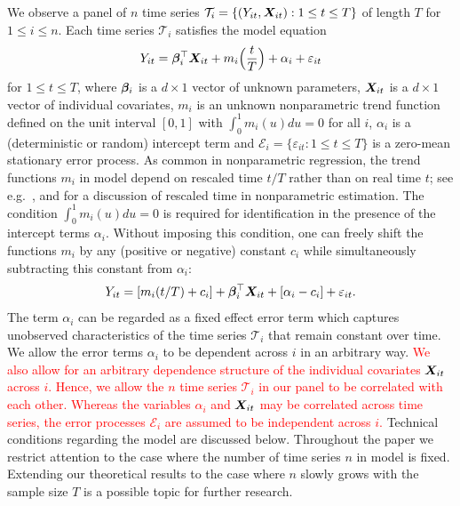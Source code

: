 \documentclass[a4paper,12pt]{article}
\makeatletter
\renewcommand{\eqref}[1]{\tagform@{\ref{#1}}}
\makeatother
\begin{document}
We observe a panel of $n$ time series $\mathcal{T}_i = \{(Y_{it}, \boldsymbol{X}_{it}): 1 \le t \le T \}$ of length $T$ for $1 \le i \le n$. Each time series $\mathcal{T}_i$ satisfies the model equation 
\begin{equation}\label{eq:model_full}
Y_{it} = \bm{\beta}^\top_i \boldsymbol{X}_{it} + m_i \Big( \frac{t}{T} \Big) + \alpha_i + \varepsilon_{it} 
\end{equation}
for $1 \le t \le T$, where $\bm{\beta}_i$ is a $d \times 1$ vector of unknown parameters, $\boldsymbol{X}_{it}$ is a $d\times 1$ vector of individual covariates, $m_i$ is an unknown nonparametric trend function defined on the unit interval $[0,1]$ with $\int_0^1 m_i(u) du = 0$ for all $i$, $\alpha_i$ is a (deterministic or random) intercept term and $\mathcal{E}_i = \{ \varepsilon_{it}: 1 \le t \le T \}$ is a zero-mean stationary error process. As common in nonparametric regression, the trend functions $m_i$ in model \eqref{eq:model_full} depend on rescaled time $t/T$ rather than on real time $t$; 
see e.g.\ \cite{Robinson1989}, \cite{Dahlhaus1997} and \cite{VogtLinton2014} for a discussion of rescaled time in nonparametric estimation. The condition $\int_0^1 m_i(u) du = 0$ is required for identification in the presence of the intercept terms $\alpha_i$. Without imposing this condition, one can freely shift the functions $m_i$ by any (positive or negative) constant $c_i$ while simultaneously subtracting this constant from $\alpha_i$:
\[ Y_{it} = [m_i(t/T) + c_i] + \bm{\beta}_i^\top \boldsymbol{X}_{it} + [\alpha_i - c_i] + \varepsilon_{it}. \]
The term $\alpha_i$ can be regarded as a fixed effect error term which captures unobserved characteristics of the time series $\mathcal{T}_i$ that remain constant over time. We allow the error terms $\alpha_i$ to be dependent across $i$ in an arbitrary way. \textcolor{red}{We also allow for an arbitrary dependence structure of the individual covariates $\boldsymbol{X}_{it}$ across $i$. Hence, %
we allow the $n$ time series $\mathcal{T}_i$ in our panel to be correlated with each other. Whereas the variables $\alpha_i$ and $\boldsymbol{X}_{it}$ may be correlated across time series, the error processes $\mathcal{E}_i$ are assumed to be independent across $i$.} Technical conditions regarding the model are discussed below. Throughout the paper we restrict attention to the case where the number of time series $n$ in model \eqref{eq:model_full} is fixed. Extending our theoretical results to the case where $n$ slowly grows with the sample size $T$ is a possible topic for further research.
\end{document}
